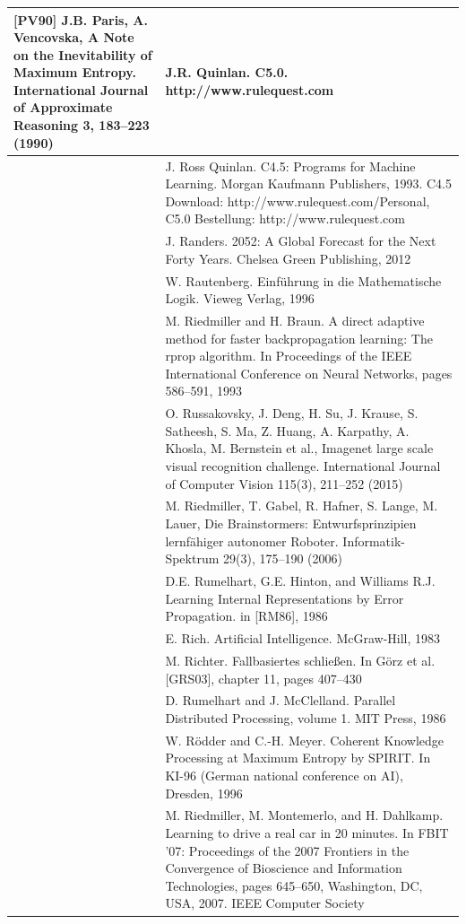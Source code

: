 \documentclass[10pt]{book}
\begin{document}
\begin{tabular}{|l|l|}
[PV90] J.B. Paris, A. Vencovska, A Note on the Inevitability of Maximum Entropy. International Journal of Approximate Reasoning 3, 183–223 (1990)
\hline [Qui] & J.R. Quinlan. C5.0. http://www.rulequest.com \\
\hline [Qui93] & J. Ross Quinlan. C4.5: Programs for Machine Learning. Morgan Kaufmann Publishers, 1993. C4.5 Download: http://www.rulequest.com/Personal, C5.0 Bestellung: http://www.rulequest.com \\
\hline [Ran12] & J. Randers. 2052: A Global Forecast for the Next Forty Years. Chelsea Green Publishing, 2012 \\
\hline [Rau96] & W. Rautenberg. Einführung in die Mathematische Logik. Vieweg Verlag, 1996 \\
\hline [RB93] & M. Riedmiller and H. Braun. A direct adaptive method for faster backpropagation learning: The rprop algorithm. In Proceedings of the IEEE International Conference on Neural Networks, pages 586–591, 1993 \\
\hline [RDS+15] & O. Russakovsky, J. Deng, H. Su, J. Krause, S. Satheesh, S. Ma, Z. Huang, A. Karpathy, A. Khosla, M. Bernstein et al., Imagenet large scale visual recognition challenge. International Journal of Computer Vision 115(3), 211–252 (2015) \\
\hline [RGH+06] & M. Riedmiller, T. Gabel, R. Hafner, S. Lange, M. Lauer, Die Brainstormers: Entwurfsprinzipien lernfähiger autonomer Roboter. Informatik-Spektrum 29(3), 175–190 (2006) \\
\hline [RHR86] & D.E. Rumelhart, G.E. Hinton, and Williams R.J. Learning Internal Representations by Error Propagation. in [RM86], 1986 \\
\hline [Ric83] & E. Rich. Artificial Intelligence. McGraw-Hill, 1983 \\
\hline [Ric03] & M. Richter. Fallbasiertes schließen. In Görz et al. [GRS03], chapter 11, pages 407–430 \\
\hline [RM86] & D. Rumelhart and J. McClelland. Parallel Distributed Processing, volume 1. MIT Press, 1986 \\
\hline [RM96] & W. Rödder and C.-H. Meyer. Coherent Knowledge Processing at Maximum Entropy by SPIRIT. In KI-96 (German national conference on AI), Dresden, 1996 \\
\hline [RMD07] & M. Riedmiller, M. Montemerlo, and H. Dahlkamp. Learning to drive a real car in 20 minutes. In FBIT '07: Proceedings of the 2007 Frontiers in the Convergence of Bioscience and Information Technologies, pages 645–650, Washington, DC, USA, 2007. IEEE Computer Society \\

\end{tabular}
\end{document}
